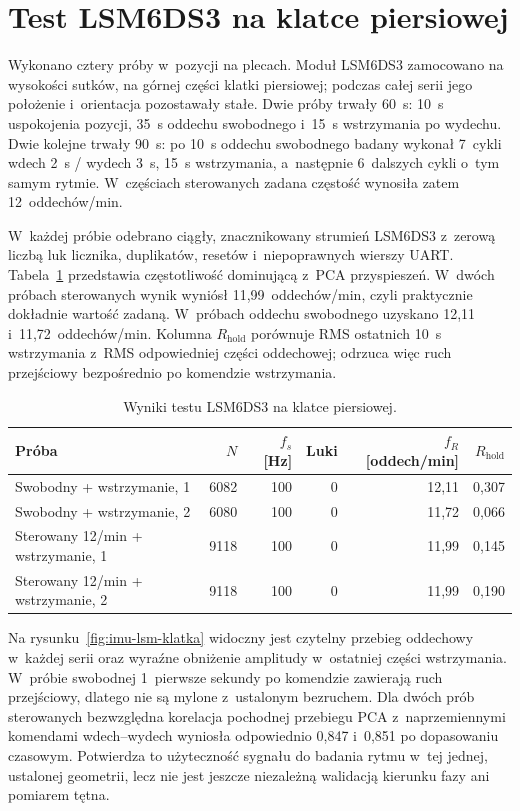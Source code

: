 \documentclass[12pt,a4paper,oneside]{report}
\begin{document}
\section{Test LSM6DS3 na klatce piersiowej}
\label{sec:imu-lsm6ds3-test}

Wykonano cztery próby w~pozycji na plecach. Moduł LSM6DS3 zamocowano na
wysokości sutków, na górnej części klatki piersiowej; podczas całej serii jego
położenie i~orientacja pozostawały stałe. Dwie próby trwały \SI{60}{s}:
\SI{10}{s} uspokojenia pozycji, \SI{35}{s} oddechu swobodnego i~\SI{15}{s}
wstrzymania po wydechu. Dwie kolejne trwały \SI{90}{s}: po \SI{10}{s}
oddechu swobodnego badany wykonał 7~cykli wdech \SI{2}{s} / wydech
\SI{3}{s}, \SI{15}{s} wstrzymania, a~następnie 6~dalszych cykli o~tym samym
rytmie. W~częściach sterowanych zadana częstość wynosiła zatem
12~oddechów/min.

W~każdej próbie odebrano ciągły, znacznikowany strumień LSM6DS3 z~zerową
liczbą luk licznika, duplikatów, resetów i~niepoprawnych wierszy UART.
Tabela~\ref{tab:imu-lsm-wyniki} przedstawia częstotliwość dominującą z~PCA
przyspieszeń. W~dwóch próbach sterowanych wynik wyniósł 11,99~oddechów/min,
czyli praktycznie dokładnie wartość zadaną. W~próbach oddechu swobodnego
uzyskano 12,11 i~11,72~oddechów/min. Kolumna $R_{\mathrm{hold}}$ porównuje
RMS ostatnich \SI{10}{s} wstrzymania z~RMS odpowiedniej części oddechowej;
odrzuca więc ruch przejściowy bezpośrednio po komendzie wstrzymania.

\begin{table}[H]
\centering
\caption{Wyniki testu LSM6DS3 na klatce piersiowej.}
\label{tab:imu-lsm-wyniki}
\begin{tabular}{@{}lrrrrr@{}}
\toprule
Próba & $N$ & $f_s$ [Hz] & Luki & $f_R$ [oddech/min] & $R_{\mathrm{hold}}$ \\
\midrule
Swobodny + wstrzymanie, 1 & 6082 & 100 & 0 & 12,11 & 0,307 \\
Swobodny + wstrzymanie, 2 & 6080 & 100 & 0 & 11,72 & 0,066 \\
Sterowany 12/min + wstrzymanie, 1 & 9118 & 100 & 0 & 11,99 & 0,145 \\
Sterowany 12/min + wstrzymanie, 2 & 9118 & 100 & 0 & 11,99 & 0,190 \\
\bottomrule
\end{tabular}
\end{table}

Na rysunku~\ref{fig:imu-lsm-klatka} widoczny jest czytelny przebieg
oddechowy w~każdej serii oraz wyraźne obniżenie amplitudy w~ostatniej części
wstrzymania. W~próbie swobodnej 1~pierwsze sekundy po komendzie zawierają
ruch przejściowy, dlatego nie są mylone z~ustalonym bezruchem. Dla dwóch prób
sterowanych bezwzględna korelacja pochodnej przebiegu PCA z~naprzemiennymi
komendami wdech--wydech wyniosła odpowiednio 0,847 i~0,851 po dopasowaniu
czasowym. Potwierdza to użyteczność sygnału do badania rytmu w~tej jednej,
ustalonej geometrii, lecz nie jest jeszcze niezależną walidacją kierunku fazy
ani pomiarem tętna.
\end{document}
